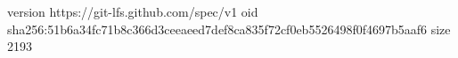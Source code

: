 version https://git-lfs.github.com/spec/v1
oid sha256:51b6a34fc71b8c366d3ceeaeed7def8ca835f72cf0eb5526498f0f4697b5aaf6
size 2193
